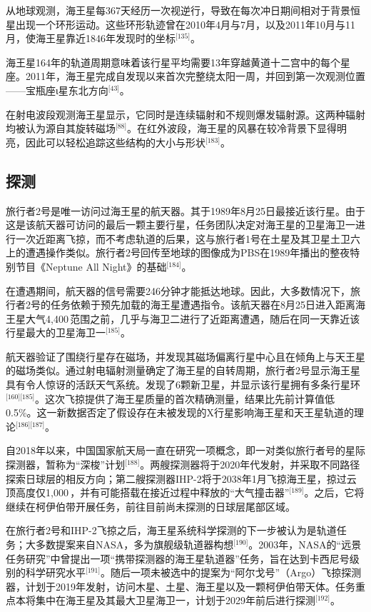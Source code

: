 从地球观测，海王星每367天经历一次视逆行，导致在每次冲日期间相对于背景恒星出现一个环形运动。这些环形轨迹曾在2010年4月与7月，以及2011年10月与11月，使海王星靠近1846年发现时的坐标\(^\text{[135]}\)。

海王星164年的轨道周期意味着该行星平均需要13年穿越黄道十二宫中的每个星座。2011年，海王星完成自发现以来首次完整绕太阳一周，并回到第一次观测位置——宝瓶座ι星东北方向\(^\text{[43]}\)。

在射电波段观测海王星显示，它同时是连续辐射和不规则爆发辐射源。这两种辐射均被认为源自其旋转磁场\(^\text{[88]}\)。在红外波段，海王星的风暴在较冷背景下显得明亮，因此可以轻松追踪这些结构的大小与形状\(^\text{[183]}\)。
\subsection{探测}
旅行者2号是唯一访问过海王星的航天器。其于1989年8月25日最接近该行星。由于这是该航天器可访问的最后一颗主要行星，任务团队决定对海王星的卫星海卫一进行一次近距离飞掠，而不考虑轨道的后果，这与旅行者1号在土星及其卫星土卫六上的遭遇操作类似。旅行者2号回传至地球的图像成为PBS在1989年播出的整夜特别节目《Neptune All Night》的基础\(^\text{[184]}\)。

在遭遇期间，航天器的信号需要246分钟才能抵达地球。因此，大多数情况下，旅行者2号的任务依赖于预先加载的海王星遭遇指令。该航天器在8月25日进入距离海王星大气4{,}400\,范围之前，几乎与海卫二进行了近距离遭遇，随后在同一天靠近该行星最大的卫星海卫一\(^\text{[185]}\)。

航天器验证了围绕行星存在磁场，并发现其磁场偏离行星中心且在倾角上与天王星的磁场类似。通过射电辐射测量确定了海王星的自转周期，旅行者2号显示海王星具有令人惊讶的活跃天气系统。发现了6颗新卫星，并显示该行星拥有多条行星环\(^\text{[160][185]}\)。这次飞掠提供了海王星质量的首次精确测量，结果比先前计算值低0.5\%。这一新数据否定了假设存在未被发现的X行星影响海王星和天王星轨道的理论\(^\text{[186][187]}\)。

自2018年以来，中国国家航天局一直在研究一项概念，即一对类似旅行者号的星际探测器，暂称为“深梭”计划\(^\text{[188]}\)。两艘探测器将于2020年代发射，并采取不同路径探索日球层的相反方向；第二艘探测器IHP-2将于2038年1月飞掠海王星，掠过云顶高度仅1{,}000\,，并有可能搭载在接近过程中释放的“大气撞击器”\(^\text{[189]}\)。之后，它将继续在柯伊伯带开展任务，前往目前尚未探测的日球层尾部区域。

在旅行者2号和IHP-2飞掠之后，海王星系统科学探测的下一步被认为是轨道任务；大多数提案来自NASA，多为旗舰级轨道器构想\(^\text{[190]}\)。2003年，NASA的“远景任务研究”中曾提出一项“携带探测器的海王星轨道器”任务，旨在达到卡西尼号级别的科学研究水平\(^\text{[191]}\)。随后一项未被选中的提案为“阿尔戈号”（Argo）飞掠探测器，计划于2019年发射，访问木星、土星、海王星以及一颗柯伊伯带天体。任务重点本将集中在海王星及其最大卫星海卫一，计划于2029年前后进行探测\(^\text{[192]}\)。

